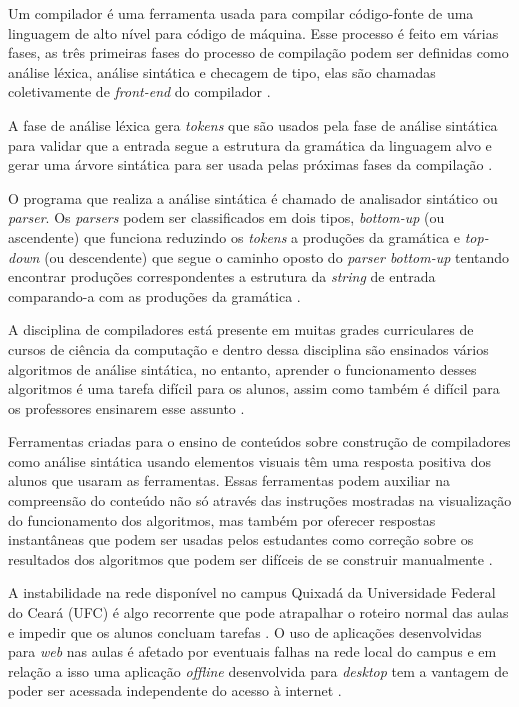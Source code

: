 \label{cap:introducao}

Um compilador é uma ferramenta usada para compilar código-fonte de uma linguagem de alto nível para código de máquina. Esse processo é feito em várias fases, as três primeiras fases do processo de compilação podem ser definidas como análise léxica, análise sintática e checagem de tipo, elas são chamadas coletivamente de \textit{front-end} do compilador \cite{mogensen2024introduction}.

A fase de análise léxica gera \textit{tokens} que são usados pela fase de análise sintática para validar que a entrada segue a estrutura da gramática da linguagem alvo e gerar uma árvore sintática para ser usada pelas próximas fases da compilação \cite{thain2020introduction}.

O programa que realiza a análise sintática é chamado de analisador sintático ou \textit{parser}. Os \textit{parsers} podem ser classificados em dois tipos, \textit{bottom-up} (ou ascendente) que funciona reduzindo os \textit{tokens} a produções da gramática e \textit{top-down} (ou descendente) que segue o caminho oposto do \textit{parser bottom-up} tentando encontrar produções correspondentes a estrutura da \textit{string} de entrada comparando-a com as produções da gramática \cite{cooper2022engineering}.

A disciplina de compiladores está presente em muitas grades curriculares de cursos de ciência da computação e dentro dessa disciplina são ensinados vários algoritmos de análise sintática, no entanto, aprender o funcionamento desses algoritmos é uma tarefa difícil para os alunos, assim como também é difícil para os professores ensinarem esse assunto \cite{sangal2018pavt}.

Ferramentas criadas para o ensino de conteúdos sobre construção de compiladores como análise sintática usando elementos visuais têm uma resposta positiva dos alunos que usaram as ferramentas. Essas ferramentas podem auxiliar na compreensão do conteúdo não só através das instruções mostradas na visualização do funcionamento dos algoritmos, mas também por oferecer respostas instantâneas que podem ser usadas pelos estudantes como correção sobre os resultados dos algoritmos que podem ser difíceis de se construir manualmente \cite{10.1145/3002136}.

A instabilidade na rede disponível no campus Quixadá da Universidade Federal do Ceará (UFC) é algo recorrente que pode atrapalhar o roteiro normal das aulas e impedir que os alunos concluam tarefas \cite{perez2023impact}. O uso de aplicações desenvolvidas para \textit{web} nas aulas é afetado por eventuais falhas na rede local do campus e em relação a isso uma aplicação \textit{offline} desenvolvida para \textit{desktop} tem a vantagem de poder ser acessada independente do acesso à internet \cite{holzer2012mobile}.

